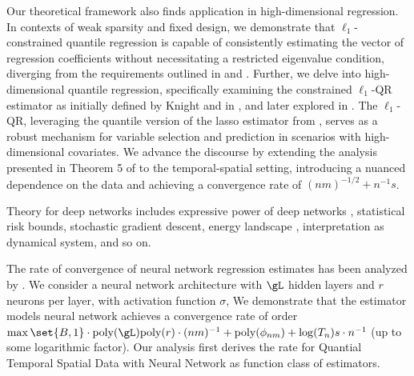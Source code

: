 \documentclass[twoside,11pt]{article}
\begin{document}
Our theoretical framework also finds application in high-dimensional regression. In contexts of weak sparsity and fixed design, we demonstrate that \(\ell_1\)-constrained quantile regression is capable of consistently estimating the vector of regression coefficients without necessitating a restricted eigenvalue condition, diverging from the requirements outlined in \cite{belloni2011} and \cite{fan2014adaptive}. Further, we delve into high-dimensional quantile regression, specifically examining the constrained \(\ell_1\)-QR estimator as initially defined by Knight and in \cite{fu2000asymptotics}, and later explored in \cite{belloni2011}. The \(\ell_1\)-QR, leveraging the quantile version of the lasso estimator from \cite{tibshirani1996regression}, serves as a robust mechanism for variable selection and prediction in scenarios with high-dimensional covariates. We advance the discourse by extending the analysis presented in Theorem 5 of \cite{madrid2022risk} to the temporal-spatial setting, introducing a nuanced dependence on the data and achieving a convergence rate of \((nm)^{-1/2} + n^{-1}s\).
 
Theory for deep networks includes 
expressive power of deep networks \citep{pmlr-v70-raghu17a}, statistical risk bounds\citep{barron1989statistical},
stochastic gradient descent\citep{reddi2019convergence}, energy landscape \citep{choromanska2015loss}, interpretation as dynamical system\citep{kumpati1990identification}, and so on. 

The rate of convergence of neural network regression estimates has been analyzed by \cite{schmidt2020nonparametric, barron1991complexity, oono2019approximation, suzuki2018adaptivity, kohler2019rate}. We consider a neural network architecture with $\gL$ hidden layers and $r$ neurons per layer, with activation function $\sigma$, 
We demonstrate that the estimator models neural network achieves a convergence rate of order 
\(\max\set{B,1}\cdot \text{poly}(\gL) \text{poly}(r)\cdot (nm)^{-1} + \text{poly}(\phi_{nm})+\log(T_n)s \cdot n^{-1}\) (up
to some logarithmic factor). Our analysis first derives the rate for Quantial Temporal Spatial Data with Neural Network as function class of estimators.
\end{document}
